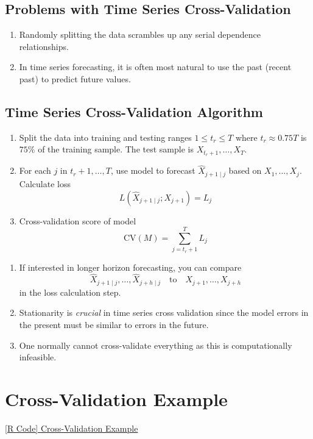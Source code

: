 \subsection*{Problems with Time Series Cross-Validation}
\begin{enumerate}[(1)]
    \item Randomly splitting the data scrambles up any serial dependence relationships.
    \item In time series forecasting, it is often most natural to use
          the past (recent past) to predict future values.
\end{enumerate}
\subsection*{Time Series Cross-Validation Algorithm}
\begin{enumerate}[(1)]
    \item Split the data into training and testing ranges $ 1\le t_r\le T $
          where $ t_r\approx 0.75T $ is $ 75\% $ of the training sample.
          The test sample is $ X_{t_r+1},\ldots,X_T $.
    \item For each $ j $ in $ t_r+1,\ldots,T $, use model to forecast
          $ \hat{X}_{j+1\mid j} $ based on $ X_1,\ldots,X_j $. Calculate loss
          \[ L(\hat{X}_{j+1\mid j};X_{j+1})=L_j \]
    \item Cross-validation score of model
          \[ \text{CV}(M)=\sum_{j=t_r+1}^{T} L_j \]
\end{enumerate}
\begin{Remark}{}{}
    \begin{enumerate}[(1)]
        \item If interested in longer horizon forecasting, you can compare
              \[ \hat{X}_{j+1\mid j},\ldots,\hat{X}_{j+h\mid j}\quad\text{to}\quad X_{j+1},\ldots,X_{j+h} \]
              in the loss calculation step.
        \item Stationarity is \emph{crucial} in time series cross validation
              since the model errors in the present must be similar to errors in the future.
        \item One normally cannot cross-validate everything as this is computationally
              infeasible.
    \end{enumerate}
\end{Remark}
\section{Cross-Validation Example}
\href{https://github.com/Hextical/university-notes/blob/master/year-3/semester-2/STAT 443/code/6.4 - Cross-Validation Example.R}{[R Code] Cross-Validation Example} %
